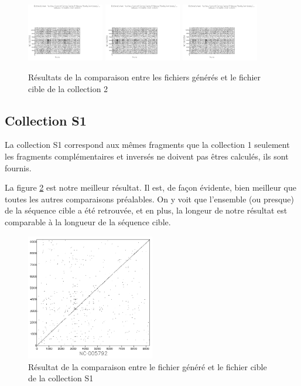 \documentclass[12pt,a4paper,final]{article}
\begin{document}
\begin{figure}[!ht]
	\centering
	\includegraphics[width=0.3\textwidth]{images/collection2/collection2_1.png}
	\includegraphics[width=0.3\textwidth]{images/collection2/collection2_2.png}
	\includegraphics[width=0.3\textwidth]{images/collection2/collection2_3.png}
	\caption{\label{coll2}Résultats de la comparaison entre les fichiers générés et le fichier cible de la collection 2}
\end{figure}

\subsection{Collection S1}
La collection S1 correspond aux mêmes fragments que la collection 1 seulement les fragments complémentaires et inversés ne doivent pas êtres calculés, ils sont fournis.

La figure \ref{collS1} est notre meilleur résultat. Il est, de façon évidente, bien meilleur que toutes les autres comparaisons préalables. On y voit que l'ensemble (ou presque) de la séquence cible a été retrouvée, et en plus, la longeur de notre résultat est comparable à la longueur de la séquence cible.

\begin{figure}[!ht]
	\centering
	\includegraphics[width=0.5\textwidth]{images/collectionS1/collectionS1.png}
	\caption{\label{collS1}Résultat de la comparaison entre le fichier généré et le fichier cible de la collection S1}
\end{figure}
\end{document}
